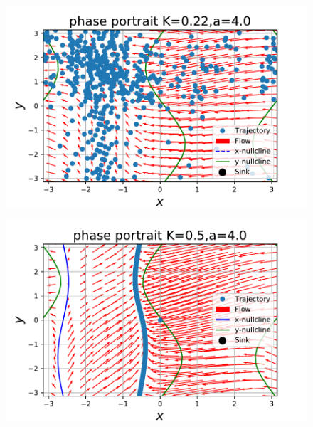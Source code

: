 \documentclass[../main]{subfiles}
\begin{document}
\begin{figure}[t]
\begin{minipage}[b]{0.47\linewidth}
      \centering
      \includegraphics[keepaspectratio, scale=0.42]{images/phase_a4K22.pdf}
      \label{fig:phase-k22}
    \end{minipage}
    \begin{minipage}[b]{0.47\linewidth}
      \centering
      \includegraphics[keepaspectratio, scale=0.42]{images/phase_a4K50.pdf}
      \label{fig:phase-k50}
    \end{minipage}\\
    \begin{minipage}[b]{0.47\linewidth}
      \centering

\end{minipage}
\end{figure}
\end{document}
